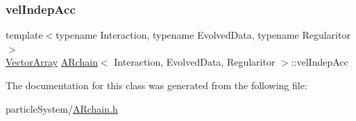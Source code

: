 \mbox{\label{class_a_rchain_a9359b4fb9f08ad849b0f1dfbdf661016}} 
\subsubsection{\texorpdfstring{vel\+Indep\+Acc}{velIndepAcc}}
{\footnotesize\ttfamily template$<$typename Interaction, typename Evolved\+Data, typename Regularitor$>$ \\
\mbox{\hyperlink{class_a_rchain_a019fbadb9f4e5892736d9127537338bb}{Vector\+Array}} \mbox{\hyperlink{class_a_rchain}{A\+Rchain}}$<$ Interaction, Evolved\+Data, Regularitor $>$\+::vel\+Indep\+Acc\hspace{0.3cm}{\ttfamily [private]}}



The documentation for this class was generated from the following file\+:\begin{DoxyCompactItemize}
\item 
particle\+System/\mbox{\hyperlink{_a_rchain_8h}{A\+Rchain.\+h}}\end{DoxyCompactItemize}
